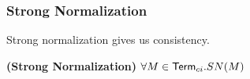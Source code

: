 
\begin{frame}
\frametitle{Strong Normalization}

Strong normalization gives us consistency.

\begin{theorem}
\textbf{(Strong Normalization)} $\forall M \in \mathsf{Term}_{ci}. SN(M)$
\label{ci:sn}
\end{theorem}


\end{frame}

